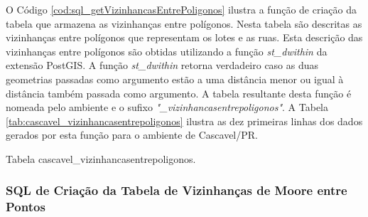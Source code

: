 O Código \ref{cod:sql_getVizinhancasEntrePoligonos} ilustra a função de criação da tabela que armazena as vizinhanças entre polígonos. Nesta tabela são descritas as vizinhanças entre polígonos que representam os lotes e as ruas. Esta descrição das vizinhanças entre polígonos são obtidas utilizando a função \textit{st\_dwithin} da extensão PostGIS. A função \textit{st\_dwithin} retorna verdadeiro caso as duas geometrias passadas como argumento estão a uma distância menor ou igual à distância também passada como argumento. A tabela resultante desta função é nomeada pelo ambiente e o sufixo \textit{"\_vizinhancasentrepoligonos"}. A Tabela \ref{tab:cascavel_vizinhancasentrepoligonos} ilustra as dez primeiras linhas dos dados gerados por esta função para o ambiente de Cascavel/PR.



\begin{table}[H]
\centering
{}
\caption{Tabela cascavel\_vizinhancasentrepoligonos.}
\label{tab:cascavel_vizinhancasentrepoligonos}
\end{table}

\subsubsection{SQL de Criação da Tabela de Vizinhanças de Moore entre Pontos}

